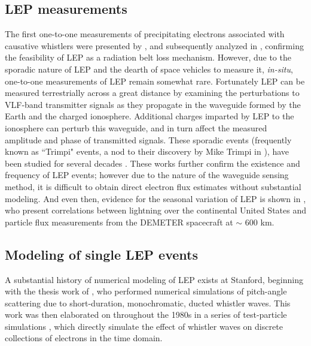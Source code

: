 
\subsection{LEP measurements}
The first one-to-one measurements of precipitating electrons associated with causative whistlers were presented by \cite{Voss1984}, and subsequently analyzed in \cite{Voss1998}, confirming the feasibility of LEP as a radiation belt loss mechanism. However, due to the sporadic nature of LEP and the dearth of space vehicles to measure it, \emph{in-situ}, one-to-one measurements of LEP remain somewhat rare.
Fortunately LEP can be measured terrestrially across a great distance by examining the perturbations to VLF-band transmitter signals as they propagate in the waveguide formed by the Earth and the charged ionosphere. Additional charges imparted by LEP to the ionosphere can perturb this waveguide, and in turn affect the measured amplitude and phase of transmitted signals. These sporadic events (frequently known as ``Trimpi" events, a nod to their discovery by Mike Trimpi in \cite{Trimpi1973}), have been studied for several decades \citep{Trimpi1973, Carpenter1984, Inan1988, Burgess1993}. These works further confirm the existence and frequency of LEP events; however due to the nature of the waveguide sensing method, it is difficult to obtain direct electron flux estimates without substantial modeling. And even then, evidence for the seasonal variation of LEP is shown in \cite{Gemelos2009}, who present correlations between lightning over the continental United States and particle flux measurements from the DEMETER spacecraft at $\sim$ 600 km.

\subsection{Modeling of single LEP events}
A substantial history of numerical modeling of LEP exists at Stanford, beginning with the thesis work of \cite{Inan1977}, who performed numerical simulations of pitch-angle scattering due to short-duration, monochromatic, ducted whistler waves. This work was then elaborated on throughout the 1980s in a series of test-particle simulations \citep{Inan1982, Chang1983, Chang1983b, Chang1985, Inan1989}, which directly simulate the effect of whistler waves on discrete collections of electrons in the time domain.

